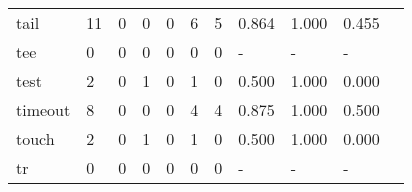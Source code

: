 \begin{longtable}{lp{1.20cm}p{1.20cm}p{1.20cm}p{1.20cm}p{1.20cm}p{1.20cm}p{1.20cm}p{1.20cm}p{1.20cm}p{1.20cm}}
tail      &                                    11 &                                                  0 &                                                  0 &                                                  0 &                                                  6 &                                                  5 &                                         0.864 &                                              1.000 &                                              0.455 \\
tee       &                                     0 &                                                  0 &                                                  0 &                                                  0 &                                                  0 &                                                  0 &                                             - &                                                  - &                                                  - \\
test      &                                     2 &                                                  0 &                                                  1 &                                                  0 &                                                  1 &                                                  0 &                                         0.500 &                                              1.000 &                                              0.000 \\
timeout   &                                     8 &                                                  0 &                                                  0 &                                                  0 &                                                  4 &                                                  4 &                                         0.875 &                                              1.000 &                                              0.500 \\
touch     &                                     2 &                                                  0 &                                                  1 &                                                  0 &                                                  1 &                                                  0 &                                         0.500 &                                              1.000 &                                              0.000 \\
tr        &                                     0 &                                                  0 &                                                  0 &                                                  0 &                                                  0 &                                                  0 &                                             - &                                                  - &                                                  - \\

\end{longtable}
